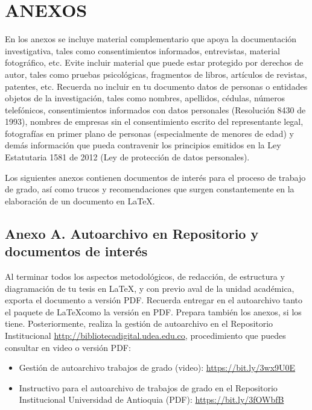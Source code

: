 \section*{ANEXOS}

En los anexos se incluye material complementario que apoya la documentación investigativa, tales como consentimientos informados, entrevistas, material fotográfico, etc. Evite incluir material que puede estar protegido por derechos de autor, tales como pruebas psicológicas, fragmentos de libros, artículos de revistas, patentes, etc. Recuerda no incluir en tu documento datos de personas o entidades objetos de la investigación, tales como nombres, apellidos, cédulas, números telefónicos, consentimientos informados con datos personales (Resolución 8430 de 1993), nombres de empresas sin el consentimiento escrito del representante legal, fotografías en primer plano de personas (especialmente de menores de edad) y demás información que pueda contravenir los principios emitidos en la Ley Estatutaria 1581 de 2012 (Ley de protección de datos personales).

Los siguientes anexos contienen documentos de interés para el proceso de trabajo de grado, así como trucos y recomendaciones que surgen constantemente en la elaboración de un documento en \LaTeX.


\newpage

\subsection*{Anexo A. Autoarchivo en Repositorio y documentos de interés}


Al terminar todos los aspectos metodológicos, de redacción, de estructura y diagramación de tu tesis en \LaTeX, y con previo aval de la unidad académica, exporta el documento a versión PDF. Recuerda entregar en el autoarchivo tanto el paquete de \LaTeX como la versión en PDF. Prepara también los anexos, si los tiene. Posteriormente, realiza la gestión de autoarchivo en el Repositorio Institucional \url{http://bibliotecadigital.udea.edu.co}, procedimiento que puedes consultar en video o versión PDF:

\begin{itemize}
    \item Gestión de autoarchivo trabajos de grado (video): \url{https://bit.ly/3wx9U0E} 
    \item Instructivo para el autoarchivo de trabajos de grado en el Repositorio Institucional Universidad de Antioquia (PDF): \url{https://bit.ly/3fOWbfB}
\end{itemize}


